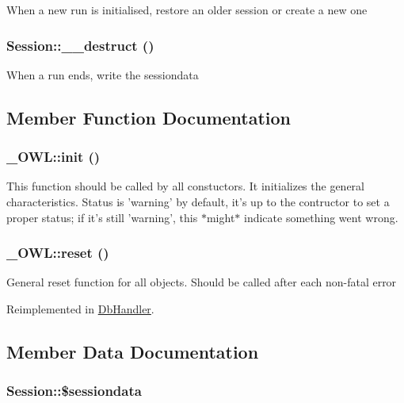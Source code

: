 When a new run is initialised, restore an older session or create a new one \hypertarget{classSession_a498272c85524e4700abc3363883165b}{
\subsubsection{\setlength{\rightskip}{0pt plus 5cm}Session::\_\-\_\-destruct ()}}
\label{classSession_a498272c85524e4700abc3363883165b}


When a run ends, write the sessiondata 

\subsection{Member Function Documentation}
\hypertarget{class__OWL_e0ef3ded56e8a6b34b6461e5a721cd3e}{
\subsubsection{\setlength{\rightskip}{0pt plus 5cm}\_\-OWL::init ()}}
\label{class__OWL_e0ef3ded56e8a6b34b6461e5a721cd3e}


This function should be called by all constuctors. It initializes the general characteristics. Status is 'warning' by default, it's up to the contructor to set a proper status; if it's still 'warning', this $\ast$might$\ast$ indicate something went wrong. \hypertarget{class__OWL_2f2a042bcf31965194c03033df0edc9b}{
\subsubsection{\setlength{\rightskip}{0pt plus 5cm}\_\-OWL::reset ()}}
\label{class__OWL_2f2a042bcf31965194c03033df0edc9b}


General reset function for all objects. Should be called after each non-fatal error 

Reimplemented in \hyperlink{classDbHandler_9982df4830f05803935bb31bac7fae3d}{DbHandler}.

\subsection{Member Data Documentation}
\hypertarget{classSession_ebcff26e749269269d3513336f17eaf1}{
\subsubsection{\setlength{\rightskip}{0pt plus 5cm}Session::\$sessiondata}}
\label{classSession_ebcff26e749269269d3513336f17eaf1}


